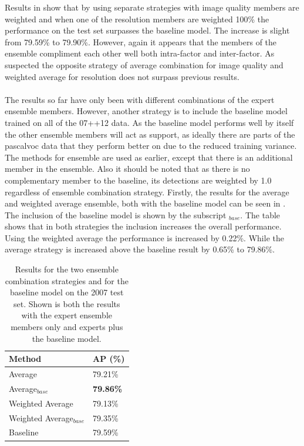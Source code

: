 Results in  show that by using separate strategies with image quality members are weighted and when one of the resolution members are weighted 100\% the performance on the test set surpasses the baseline model. The increase is slight from 79.59\% to 79.90\%. However, again it appears that the members of the ensemble compliment each other well both intra-factor and inter-factor. As suspected the opposite strategy of average combination for image quality and weighted average for resolution does not surpass previous results. 
\\\\
The results so far have only been with different combinations of the expert ensemble members. However, another strategy is to include the baseline model trained on all of the 07++12 data. As the baseline model performs well by itself the other ensemble members will act as support, as ideally there are parts of the \gls{pascalvoc} data that they perform better on due to the reduced training variance. The methods for ensemble are used as earlier, except that there is an additional member in the ensemble. Also it should be noted that as there is no complementary member to the baseline, its detections are weighted by 1.0 regardless of ensemble combination strategy. Firstly, the results for the average and weighted average ensemble, both with the baseline model can be seen in . The inclusion of the baseline model is shown by the subscript $_{base}$. The table shows that in both strategies the inclusion increases the overall performance. Using the weighted average the performance is increased by 0.22\%. While the average strategy is increased above the baseline result by 0.65\% to 79.86\%.

\begin{table}[h]
\centering
\caption{Results for the two ensemble combination strategies and for the baseline model on the 2007 test set. Shown is both the results with the expert ensemble members only and experts plus the baseline model.}
\label{tab:ensemble_base}
\begin{tabular}{|l|l|}
\hline
\textbf{Method}           & \textbf{AP (\%)} \\ \hline
Average          & 79.21\% \\ \hline
Average$_{base}$          & \textbf{79.86\%} \\ \hline
Weighted Average & 79.13\% \\ \hline
Weighted Average$_{base}$ & 79.35\% \\ \hline
Baseline         & 79.59\% \\ \hline
\end{tabular}
\end{table}

